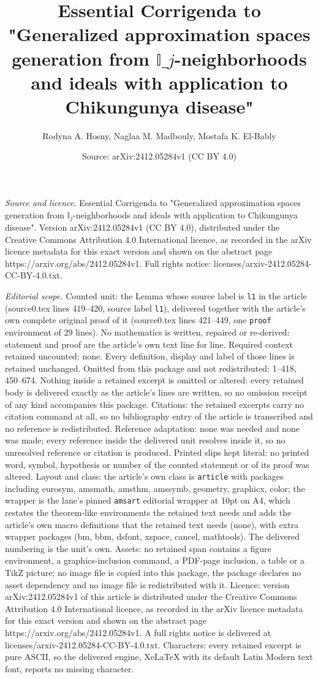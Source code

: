 \documentclass[10pt,a4paper]{amsart}
\title[Essential Corrigenda to "Generalized approximation spaces ge]{Essential Corrigenda to "Generalized approximation spaces generation from $\mathbb{I}\_{j}$-neighborhoods and ideals with application to Chikungunya disease"}
\author{Rodyna A. Hosny, Naglaa M. Madbouly, Mostafa K. El-Bably}
\date{Source: arXiv:2412.05284v1 (CC BY 4.0)}
\begin{document}
\maketitle

\noindent\emph{Source and licence.} Essential Corrigenda to "Generalized approximation spaces generation from $\mathbb{I}_{j}$-neighborhoods and ideals with application to Chikungunya disease". Version arXiv:2412.05284v1 (CC BY 4.0), distributed under the Creative Commons Attribution 4.0 International licence, as recorded in the arXiv licence metadata for this exact version and shown on the abstract page https://arxiv.org/abs/2412.05284v1. Full rights notice: licenses/arxiv-2412.05284-CC-BY-4.0.txt.\par\smallskip

\noindent\textit{Editorial scope.} Counted unit: the Lemma whose source label is \texttt{l1} in the article (source0.tex lines 419--420, source label \texttt{l1}), delivered together with the article's own complete original proof of it (source0.tex lines 421--449, one \texttt{proof} environment of 29 lines). No mathematics is written, repaired or re-derived: statement and proof are the article's own text line for line. Required context retained uncounted: none. Every definition, display and label of those lines is retained unchanged. Omitted from this package and not redistributed: 1--418, 450--674. Nothing inside a retained excerpt is omitted or altered: every retained body is delivered exactly as the article's lines are written, so no omission receipt of any kind accompanies this package. Citations: the retained excerpts carry no citation command at all, so no bibliography entry of the article is transcribed and no reference is redistributed. Reference adaptation: none was needed and none was made; every reference inside the delivered unit resolves inside it, so no unresolved reference or citation is produced. Printed slips kept literal: no printed word, symbol, hypothesis or number of the counted statement or of its proof was altered. Layout and class: the article's own class is \texttt{article} with packages including eurosym, amsmath, amsthm, amssymb, geometry, graphicx, color; the wrapper is the lane's pinned \texttt{amsart} editorial wrapper at 10pt on A4, which restates the theorem-like environments the retained text needs and adds the article's own macro definitions that the retained text needs (none), with extra wrapper packages (bm, bbm, dsfont, xspace, cancel, mathtools). The delivered numbering is the unit's own. Assets: no retained span contains a figure environment, a graphics-inclusion command, a PDF-page inclusion, a table or a TikZ picture; no image file is copied into this package, the package declares no asset dependency and no image file is redistributed with it. Licence: version arXiv:2412.05284v1 of this article is distributed under the Creative Commons Attribution 4.0 International licence, as recorded in the arXiv licence metadata for this exact version and shown on the abstract page https://arxiv.org/abs/2412.05284v1. A full rights notice is delivered at licenses/arxiv-2412.05284-CC-BY-4.0.txt. Characters: every retained excerpt is pure ASCII, so the delivered engine, XeLaTeX with its default Latin Modern text font, reports no missing character.
\end{document}
